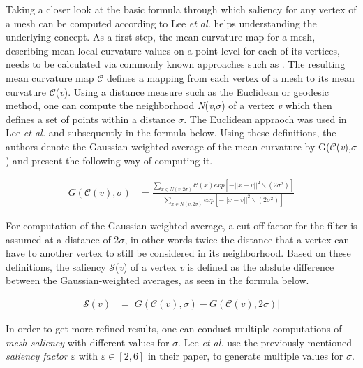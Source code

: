 Taking a closer look at the basic formula through which saliency for any vertex of a mesh can be computed according to Lee \textit{et al.} helps understanding the underlying concept. As a first step, the mean curvature map for a mesh, describing mean local curvature values on a point-level for each of its vertices, needs to be calculated via commonly known approaches such as \cite{taubin1995estimating}. The resulting mean curvature map $\mathscr{C}$ defines a mapping from each vertex of a mesh to its mean curvature $\mathscr{C}$(\textit{v}). Using a distance measure such as the Euclidean or geodesic method, one can compute the neighborhood \textit{N}(\textit{v},$\sigma$) of a vertex \textit{v} which then defines a set of points within a distance $\sigma$. The Euclidean appraoch was used in Lee \textit{et al.} and subsequently in the formula below.
Using these definitions, the authors denote the Gaussian-weighted average of the mean curvature by G($\mathscr{C}$(\textit{v}),$\sigma$) and present the following way of computing it.

\begin{align*}
G(\mathscr{C}(v),\sigma) &= \frac
	{
		\sum_{x \in N(v,2\sigma)}
			\mathscr{C}(x)exp	[-||x-v||^2 \backslash(2\sigma^2)]
	}{
		\sum_{x \in N(v,2\sigma)}
			exp [-||x-v||^2 \backslash(2\sigma^2)]
	}
\end{align*}

For computation of the Gaussian-weighted average, a cut-off factor for the filter is assumed at a distance of 2$\sigma$, in other words twice the distance that a vertex can have to another vertex to still be considered in its neighborhood.
Based on these definitions, the saliency $\mathscr{S}$(\textit{v}) of a vertex \textit{v} is defined as the abslute difference between the Gaussian-weighted averages, as seen in the formula below.

\begin{align*}
\mathscr{S}(\textit{v}) &= |\textit{G}(\mathscr{C}(\textit{v}),\sigma) - G(\mathscr{C}(\textit{v}),2\sigma)|
\end{align*}

In order to get more refined results, one can conduct multiple computations of \textit{mesh saliency} with different values for $\sigma$. Lee \textit{et al.} use the previously mentioned \textit{saliency factor} $\varepsilon$ with $\varepsilon \in [2,6]$ in their paper, to generate multiple values for $\sigma$.

